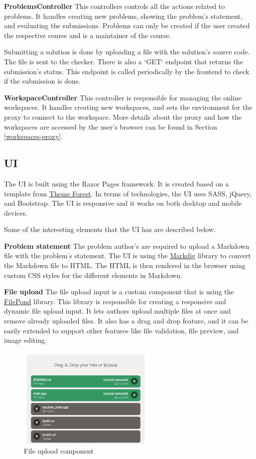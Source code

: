 \documentclass[12pt,a4paper]{report}
\begin{document}
\textbf{ProblemsController}
This controllers controls all the actions related to problems. It handles creating new problems, showing the problem's statement, and evaluating the submissions. Problems can only be created if the user created the respective course and is a maintainer of the course.

Submitting a solution is done by uploading a file with the solution's source code. The file is sent to the checker. There is also a `GET` endpoint that returns the submission's status. This endpoint is called periodically by the frontend to check if the submission is done.

\textbf{WorkspaceController}
This controller is responsible for managing the online workspaces. It handles creating new workspaces, and sets the environment for the proxy to connect to the workspace. More details about the proxy and how the workspaces are accessed by the user's browser can be found in Section \ref{workspaces-proxy}.

\subsection{UI}
The UI is built using the Razor Pages framework. It is created based on a template from \href{https://themeforest.net/}{Theme Forest}.
In terms of technologies, the UI uses SASS, jQuery, and Bootstrap. The UI is responsive and it works on both desktop and mobile devices.

Some of the interesting elements that the UI has are described below.

\textbf{Problem statement}
The problem author's are required to upload a Markdown file with the problem's statement. The UI is using the \href{https://github.com/xoofx/markdig}{Markdig} library to convert the Markdown file to HTML. The HTML is then rendered in the browser using custom CSS styles for the different elements in Markdown.

\textbf{File upload}
The file upload input is a custom component that is using the \href{https://pqina.nl/filepond/}{FilePond} library. This library is responsible for creating a responsive and dynamic file upload input. It lets authors upload multiple files at once and remove already uploaded files. It also has a drag and drop feature, and it can be easily extended to support other features like file validation, file preview, and image editing. 

\begin{figure}[h]
	\centering
	\includegraphics[width=250px]{./pics/file-uploader.png}
	\caption{File upload component}
	\label{fig:file-upload}
\end{figure}
\end{document}
